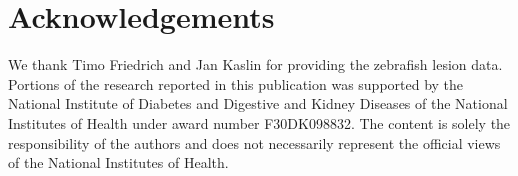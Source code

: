 
\section*{Acknowledgements}
  \label{sec:acknowledgements}

  We thank Timo Friedrich and Jan Kaslin for providing the zebrafish lesion data. Portions of the research reported in this publication was supported by the National Institute of Diabetes and Digestive and Kidney Diseases of the National Institutes of Health under award number F30DK098832. The content is solely the responsibility of the authors and does not necessarily represent the official views of the National Institutes of Health.
